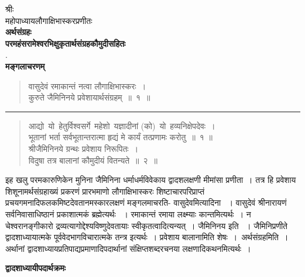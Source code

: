 \documentclass[11pt, openany]{book}
\makeatletter
\newcommand{\devanagarinumeral}[1]{%
	\devanagaridigits{\number \csname c@#1\endcsname}} %
\makeatother
\begin{document}
\newpage
\thispagestyle{empty}
\onehalfspacing
\begin{center}
श्रीः\\
\vspace{3mm}
महोपाध्यायलौगाक्षिभास्करप्रणीतः\\
\vspace{3mm}
\textbf{\Huge अर्थसंग्रहः}\\
\vspace{3mm}
\textbf{\large परमहंसरामेश्वरभिक्षुकृतार्थसंग्रहकौमुदीसहितः}\\
\vspace{3mm}
{\bld .}\\
\vspace{3mm}
\textbf{मङ्गलाचरणम्}
\end{center}
\begin{quote}
    \al
वासुदेवं रमाकान्तं नत्वा लौगाक्षिभास्करः~।~\\
कुरुते जैमिनिनये प्रवेशायार्थसंग्रहम्~॥~१~॥   
\end{quote}
\hrule
\begin{quote}
\qtl  
आद्यो~यो~हेतुर्विश्वसर्गे~महेशो~यज्ञादीनां (को)~यो~हव्यनिक्षेपदेवः~।\\
भूतानां भर्ता सर्वभूतान्तरात्मा हृद्यं मे कार्यं तत्प्रणामः करोतु~॥~१
॥\\

श्रीजैमिनिनये ग्रन्थः प्रवेशाय निरूपितः~।\\
विदुषा तत्र बालानां कौमुदीयं वितन्यते~॥~२~॥
\end{quote}
 
इह खलु परमकारुणिकेन मुनिना जैमिनिना धर्माधर्मविवेकाय द्वादशलक्षणी मीमांसा प्रणीता~। तत्र हि प्रवेशाय शिशूनामर्थसंग्रहाख्यं प्रकरणं प्रारभमाणो लौगाक्षिभास्करः शिष्टाचारपरिप्राप्तं प्रचयगमनादिफलकमिष्टदेवतानमस्कारलक्षणं मङ्गलमाचरति- {\br वासुदेवमित्यादिना} ~। वासुदेवं श्रीनारायणं सर्वनिवासाधिष्ठानं प्रकाशात्मकं ब्रह्मेत्यर्थः
~। रमाकान्तं रमाया लक्ष्म्याः कान्तमित्यर्थः~। न चेश्वरानङ्गीकारो द्रव्यत्यागोद्देश्यविष्णुदेवतायाः स्वीकृतत्वादित्यन्यत्~। {\br जैमिनिनय इति ~।} जैमिनिप्रणीते द्वादशाध्यायात्मके पूर्ववेदभागविचारात्मके तन्त्र इत्यर्थः~। प्रवेशाय बालानामिति शेषः~।~{\br अर्थसंग्रहमिति~।} अर्थानां द्वादशाध्यायप्रतिपाद्यप्रमाणादिपदार्थानां संक्षिप्तशब्दरचनया लक्षणादिकथनमित्यर्थः~।
\newpage
\fancyhead[LE,RO]{\thepage}
\renewcommand{\thepage}{\devanagarinumeral{page}}
\setcounter{page}{2}
\fancyhead[RE]{[द्वादशाध्यायीपदार्थक्रमः]}
\begin{center}
\textbf{द्वादशाध्यायीपदार्थक्रमः}    
\end{center}
\renewcommand{\thefootnote}{\devanagarinumeral{footnote}}
\end{document}
